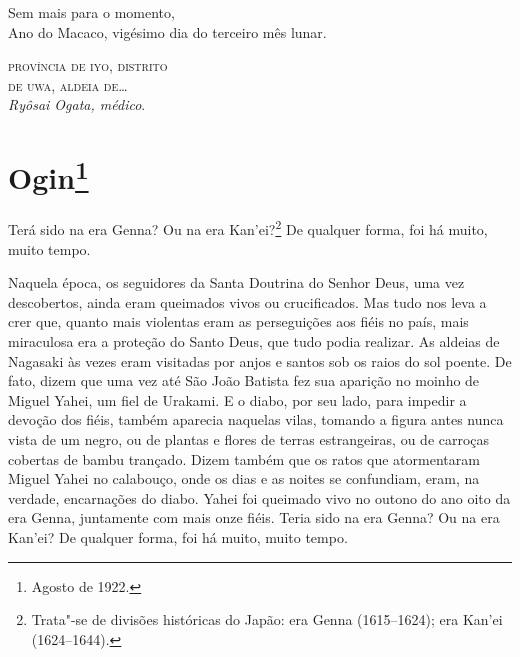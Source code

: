 \medskip

\noindent Sem mais para o momento,\\
Ano do Macaco, vigésimo dia do terceiro mês lunar.

\medskip

\begin{flushright}
\noindent\textsc{província de iyo, distrito\\de uwa, aldeia de\ldots{}}\\
\smallskip
\textit{Ryôsai Ogata, médico}.
\end{flushright}

\chapter{Ogin\footnote{Agosto de 1922.}}

\noindent{}Terá sido na era Genna? Ou na era Kan'ei?\footnote{ Trata"-se de divisões
históricas do Japão: era Genna (1615--1624); era Kan'ei (1624--1644).}
De qualquer forma, foi há muito, muito tempo.

Naquela época, os seguidores da Santa Doutrina do Senhor Deus, uma vez
descobertos, ainda eram queimados vivos ou crucificados. Mas tudo nos
leva a crer que, quanto mais violentas eram as perseguições aos fiéis
no país, mais miraculosa era a proteção do Santo Deus, que tudo podia
realizar. As aldeias de Nagasaki às vezes eram visitadas por anjos e
santos sob os raios do sol poente. De fato, dizem que uma vez até São
João Batista fez sua aparição no moinho de Miguel Yahei, um fiel de
Urakami. E o diabo, por seu lado, para impedir a devoção dos fiéis,
também aparecia naquelas vilas, tomando a figura antes nunca vista de
um negro, ou de plantas e flores de terras estrangeiras, ou de carroças
cobertas de bambu trançado. Dizem também que os ratos que atormentaram
Miguel Yahei no calabouço, onde os dias e as noites se confundiam, eram, na verdade,
encarnações do diabo. Yahei foi queimado vivo no outono do ano oito da
era Genna, juntamente com mais onze fiéis. Teria sido na era Genna? Ou
na era Kan'ei? De qualquer forma, foi há muito, muito tempo.

